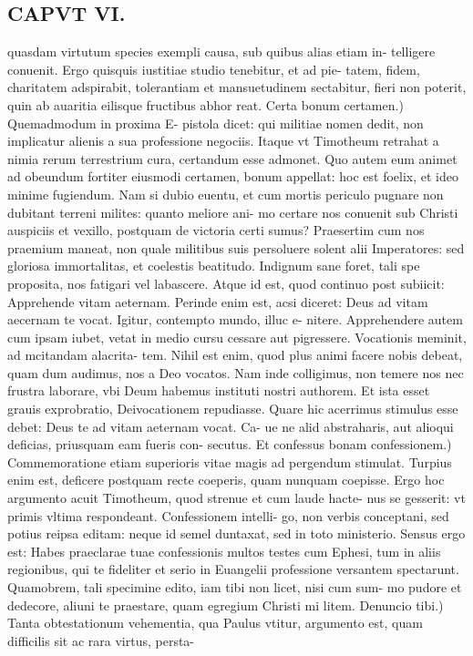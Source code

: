 \documentclass{article}
\begin{document}
\begin{pages}
\section*{CAPVT VI. }
\marginpar{[ p.79 ]}\pstart quasdam virtutum species exempli causa, sub quibus alias etiam in- telligere conuenit. Ergo quisquis iustitiae studio tenebitur, et ad pie- tatem, fidem, charitatem adspirabit, tolerantiam et mansuetudinem sectabitur, fieri non poterit, quin ab auaritia eilisque fructibus abhor reat.  \pend\pstart Certa bonum certamen.) Quemadmodum in proxima E- pistola dicet: qui militiae nomen dedit, non implicatur alienis a sua professione negociis. Itaque vt Timotheum retrahat a nimia rerum terrestrium cura, certandum esse admonet. Quo autem eum animet ad obeundum fortiter eiusmodi certamen, bonum appellat: hoc est foelix, et ideo minime fugiendum. Nam si dubio euentu, et cum mortis periculo pugnare non dubitant terreni milites: quanto meliore ani- mo certare nos conuenit sub Christi auspiciis et vexillo, postquam de victoria certi sumus? Praesertim cum nos praemium maneat, non quale militibus suis persoluere solent alii Imperatores: sed gloriosa immortalitas, et coelestis beatitudo. Indignum sane foret, tali spe proposita, nos fatigari vel labascere. Atque id est, quod continuo post subiicit: Apprehende vitam aeternam. Perinde enim est, acsi diceret: Deus ad vitam aecernam te vocat. Igitur, contempto mundo, illuc e- nitere. Apprehendere autem cum ipsam iubet, vetat in medio cursu cessare aut pigressere. Vocationis meminit, ad mcitandam alacrita- tem. Nihil est enim, quod plus animi facere nobis debeat, quam dum audimus, nos a Deo vocatos. Nam inde colligimus, non temere nos nec frustra laborare, vbi Deum habemus instituti nostri authorem. Et ista esset grauis exprobratio, Deivocationem repudiasse. Quare hic acerrimus stimulus esse debet: Deus te ad vitam aeternam vocat. Ca- ue ne alid abstraharis, aut alioqui deficias, priusquam eam fueris con- secutus.  \pend\pstart Et confessus bonam confessionem.) Commemoratione etiam superioris vitae magis ad pergendum stimulat. Turpius enim est, deficere postquam recte coeperis, quam nunquam coepisse. Ergo hoc argumento acuit Timotheum, quod strenue et cum laude hacte- nus se gesserit: vt primis vltima respondeant. Confessionem intelli- go, non verbis conceptani, sed potius reipsa editam: neque id semel duntaxat, sed in toto ministerio. Sensus ergo est: Habes praeclarae tuae confessionis multos testes cum Ephesi, tum in aliis regionibus, qui te fideliter et serio in Euangelii professione versantem spectarunt. Quamobrem, tali specimine edito, iam tibi non licet, nisi cum sum- mo pudore et dedecore, aliuni te praestare, quam egregium Christi mi litem.  \pend\pstart Denuncio tibi.) Tanta obtestationum vehementia, qua Paulus vtitur, argumento est, quam difficilis sit ac rara virtus, persta-  \pend

\end{pages}
\end{document}
